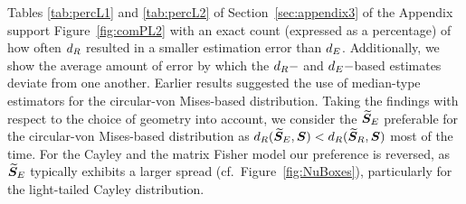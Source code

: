 Tables \ref{tab:percL1} and \ref{tab:percL2} of Section~\ref{sec:appendix3} of the Appendix support Figure~\ref{fig:comPL2} with an exact count (expressed as a percentage) of how often ${d_R}$ resulted in a smaller estimation error than ${d_E}$.  Additionally, we show the average amount of error by which the ${d_R}-$ and ${d_E}-$based estimates deviate from one another.   
Earlier results suggested the use of median-type estimators for the circular-von Mises-based distribution. Taking the findings with respect to the choice of geometry into account, we consider the ${\widetilde{\bm S}_E}$ preferable for the circular-von Mises-based distribution as ${d_R}({\widetilde{\bm S}_E},\bm S) < {d_R}({\widetilde{\bm S}_R},\bm S)$ most of the time.  For the Cayley and the matrix Fisher model our preference is reversed, as ${\widetilde{\bm S}_E}$ typically exhibits a larger spread (cf.~Figure~\ref{fig:NuBoxes}), particularly for the light-tailed Cayley distribution. 


